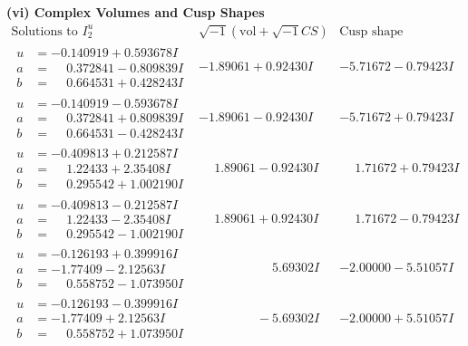 \documentclass[1p]{elsarticle_modified}
\theoremstyle{definition}
\newcommand{\I}{\sqrt{-1}}
\begin{document}
\newpage\flushleft \textbf{(vi) Complex Volumes and Cusp Shapes}
$$\begin{array}{c|c|c}  
\text{Solutions to }I^u_{2}& \I (\text{vol} + \sqrt{-1}CS) & \text{Cusp shape}\\
 \hline 
\begin{aligned}
u &= -0.140919 + 0.593678 I \\
a &= \phantom{-}0.372841 - 0.809839 I \\
b &= \phantom{-}0.664531 + 0.428243 I\end{aligned}
 & -1.89061 + 0.92430 I & -5.71672 - 0.79423 I \\ \hline\begin{aligned}
u &= -0.140919 - 0.593678 I \\
a &= \phantom{-}0.372841 + 0.809839 I \\
b &= \phantom{-}0.664531 - 0.428243 I\end{aligned}
 & -1.89061 - 0.92430 I & -5.71672 + 0.79423 I \\ \hline\begin{aligned}
u &= -0.409813 + 0.212587 I \\
a &= \phantom{-}1.22433 + 2.35408 I \\
b &= \phantom{-}0.295542 + 1.002190 I\end{aligned}
 & \phantom{-}1.89061 - 0.92430 I & \phantom{-}1.71672 + 0.79423 I \\ \hline\begin{aligned}
u &= -0.409813 - 0.212587 I \\
a &= \phantom{-}1.22433 - 2.35408 I \\
b &= \phantom{-}0.295542 - 1.002190 I\end{aligned}
 & \phantom{-}1.89061 + 0.92430 I & \phantom{-}1.71672 - 0.79423 I \\ \hline\begin{aligned}
u &= -0.126193 + 0.399916 I \\
a &= -1.77409 - 2.12563 I \\
b &= \phantom{-}0.558752 - 1.073950 I\end{aligned}
 & \phantom{-0.000000 -}5.69302 I & -2.00000 - 5.51057 I \\ \hline\begin{aligned}
u &= -0.126193 - 0.399916 I \\
a &= -1.77409 + 2.12563 I \\
b &= \phantom{-}0.558752 + 1.073950 I\end{aligned}
 & \phantom{-0.000000 } -5.69302 I & -2.00000 + 5.51057 I \\ \hline\begin{aligned}

\end{aligned}
\end{array}$$
\end{document}
